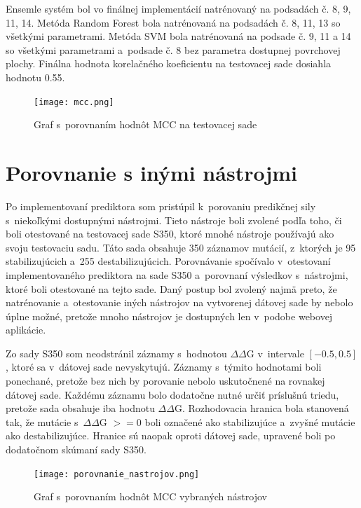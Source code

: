Ensemle systém bol vo finálnej implementácií natrénovaný na podsadách č. 8, 9, 11, 14. Metóda Random Forest bola natrénovaná na podsadách č. 8, 11, 13 so všetkými parametrami. Metóda SVM bola natrénovaná na podsade č. 9, 11 a 14 so všetkými parametrami a~podsade č. 8 bez parametra dostupnej povrchovej plochy. Finálna hodnota korelačného koeficientu na testovacej sade dosiahla hodnotu 0.55. 

\begin{figure}[H]
	\centering
	\begin{center}
		\scalebox{0.6}
		{   
			\texttt{[image: mcc.png]}
		}
		\caption{Graf s~porovnaním hodnôt MCC na testovacej sade}
	\end{center}
\end{figure}

\section{Porovnanie s inými nástrojmi}

Po implementovaní prediktora som pristúpil k~porovaniu predikčnej sily s~niekoľkými dostupnými nástrojmi. Tieto nástroje boli zvolené podľa toho, či boli otestované na testovacej sade S350, ktoré mnohé nástroje používajú ako svoju testovaciu sadu. Táto sada obsahuje 350 záznamov mutácií, z~ktorých je 95 stabilizujúcich a~255 destabilizujúcich. 
Porovnávanie spočívalo v~otestovaní implementovaného prediktora na sade S350 a~porovnaní výsledkov s~nástrojmi, ktoré boli otestované na tejto sade. Daný postup bol zvolený najmä preto, že natrénovanie a~otestovanie iných nástrojov na vytvorenej dátovej sade by nebolo úplne možné, pretože mnoho nástrojov je dostupných len v~podobe webovej aplikácie.

Zo sady S350 som neodstránil záznamy s~hodnotou $\Delta\Delta$G v~intervale $\left[-0.5,0.5\right]$, ktoré sa v~dátovej sade nevyskytujú. Záznamy s~týmito hodnotami boli ponechané, pretože bez nich by porovanie nebolo uskutočnené na rovnakej dátovej sade. Každému záznamu bolo dodatočne nutné určiť príslušnú triedu, pretože sada obsahuje iba hodnotu $\Delta\Delta$G. Rozhodovacia hranica bola stanovená tak, že mutácie s~$\Delta\Delta$G $>= 0$ boli označené ako stabilizujúce a~zvyšné mutácie ako destabilizujúce. Hranice sú naopak oproti dátovej sade, upravené boli po dodatočnom skúmaní sady S350. 


\begin{figure}[H]
	\centering
	\begin{center}
		\scalebox{0.7}
		{   
			\texttt{[image: porovnanie\_nastrojov.png]}
		}
		\caption{Graf s~porovnaním hodnôt MCC vybraných nástrojov}
		\label{porovnanie}
	\end{center}
\end{figure}

